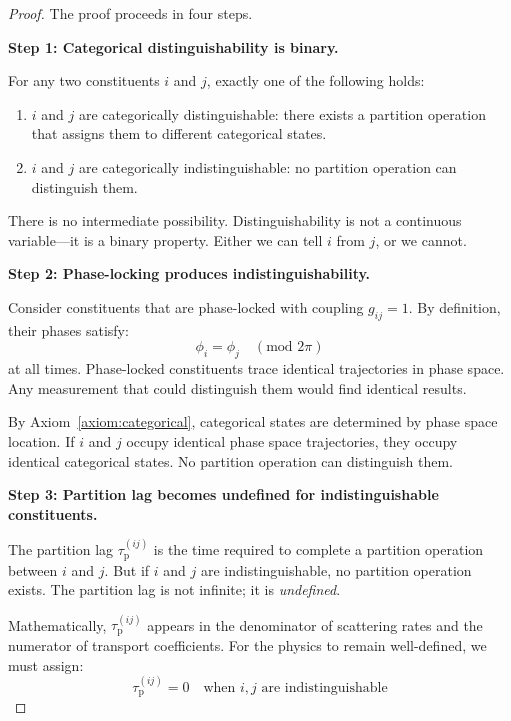 \documentclass[twocolumn,10pt,aps,prd,superscriptaddress,nofootinbib]{revtex4-2}
\theoremstyle{remark}
\newcommand{\tauP}{\tau_{\mathrm{p}}}
\newcommand{\Gij}{g_{ij}}
\begin{document}
\begin{proof}
The proof proceeds in four steps.

\textbf{Step 1: Categorical distinguishability is binary.}

For any two constituents $i$ and $j$, exactly one of the following holds:
\begin{enumerate}
\item[(a)] $i$ and $j$ are categorically distinguishable: there exists a partition operation that assigns them to different categorical states.
\item[(b)] $i$ and $j$ are categorically indistinguishable: no partition operation can distinguish them.
\end{enumerate}

There is no intermediate possibility. Distinguishability is not a continuous variable---it is a binary property. Either we can tell $i$ from $j$, or we cannot.

\textbf{Step 2: Phase-locking produces indistinguishability.}

Consider constituents that are phase-locked with coupling $\Gij = 1$. By definition, their phases satisfy:
\begin{equation}
\phi_i = \phi_j \quad (\text{mod } 2\pi)
\end{equation}
at all times. Phase-locked constituents trace identical trajectories in phase space. Any measurement that could distinguish them would find identical results.

By Axiom~\ref{axiom:categorical}, categorical states are determined by phase space location. If $i$ and $j$ occupy identical phase space trajectories, they occupy identical categorical states. No partition operation can distinguish them.

\textbf{Step 3: Partition lag becomes undefined for indistinguishable constituents.}

The partition lag $\tauP^{(ij)}$ is the time required to complete a partition operation between $i$ and $j$. But if $i$ and $j$ are indistinguishable, no partition operation exists. The partition lag is not infinite; it is \emph{undefined}.

Mathematically, $\tauP^{(ij)}$ appears in the denominator of scattering rates and the numerator of transport coefficients. For the physics to remain well-defined, we must assign:
\begin{equation}
\tauP^{(ij)} = 0 \quad \text{when } i, j \text{ are indistinguishable}
\end{equation}


\end{proof}
\end{document}
